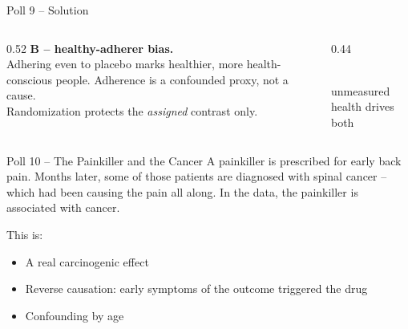 \documentclass[aspectratio=169]{beamer}
\begin{document}
\begin{frame}{Poll 9 \;--\; Solution}
  \small
  \begin{columns}[T]
    \begin{column}{0.52\textwidth}
      \textcolor{good}{\textbf{B -- healthy-adherer bias.}}\\[0.4em]
      Adhering even to placebo marks healthier, more health-conscious people.
      Adherence is a confounded proxy, not a cause.\\[0.3em]
      Randomization protects the \emph{assigned} contrast only.
    \end{column}
    \begin{column}{0.44\textwidth}
      \centering
      \\[0.3em]
      {\scriptsize unmeasured health drives both}
    \end{column}
  \end{columns}
\end{frame}

\begin{frame}{Poll 10 \;--\; The Painkiller and the Cancer}
  \small
  A painkiller is prescribed for early back pain. Months later, some of those
  patients are diagnosed with spinal cancer -- which had been causing the pain
  all along. In the data, the painkiller is associated with cancer.
  \vspace{0.8em}

  This is:
  \begin{itemize}
    \item[\textbf{A.}] A real carcinogenic effect
    \item[\textbf{B.}] Reverse causation: early symptoms of the outcome triggered the drug
    \item[\textbf{C.}] Confounding by age
  \end{itemize}
\end{frame}
\end{document}
